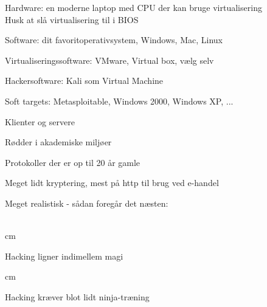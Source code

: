 \documentclass[Screen16to9,17pt]{foils}
\begin{document}


\begin{list2}
\item Hardware: en moderne laptop med CPU der kan bruge virtualisering\\
Husk at slå virtualisering til i BIOS
\item Software: dit favoritoperativsystem, Windows, Mac, Linux
\item Virtualiseringssoftware: VMware, Virtual box, vælg selv
\item Hackersoftware: Kali som Virtual Machine 
\item Soft targets: Metasploitable, Windows 2000, Windows XP, ...
\end{list2}







\begin{list1}
\item Klienter og servere
\item Rødder i akademiske miljøer
\item Protokoller der er op til 20 år gamle
\item Meget lidt kryptering, mest på http til brug ved e-handel
\end{list1}


Meget realistisk - sådan foregår det næsten:\\
\\





 cm

\centerline{Hacking ligner indimellem  magi}




 cm
\centerline{Hacking kræver blot lidt ninja-træning}
\end{document}
